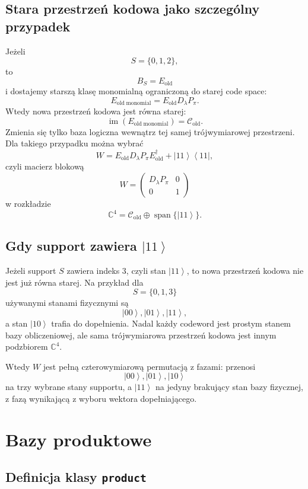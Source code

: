 \documentclass[11pt,a4paper]{article}
\newcommand{\C}{\mathbb{C}}
\newcommand{\Eold}{E_{\mathrm{old}}}
\newcommand{\Cold}{\mathcal{C}_{\mathrm{old}}}
\newcommand{\im}{\operatorname{im}}
\newcommand{\ket}[1]{\left|#1\right\rangle}
\newcommand{\bra}[1]{\left\langle#1\right|}
\begin{document}
\subsection{Stara przestrzeń kodowa jako szczególny przypadek}

Jeżeli
\[
    S=\{0,1,2\},
\]
to
\[
    B_S=\Eold
\]
i dostajemy starszą klasę monomialną ograniczoną do starej code space:
\[
    E_{\mathrm{old\;monomial}}
    =
    \Eold D_\lambda P_\pi.
\]
Wtedy nowa przestrzeń kodowa jest równa starej:
\[
    \im(E_{\mathrm{old\;monomial}})=\Cold.
\]
Zmienia się tylko baza logiczna wewnątrz tej samej trójwymiarowej przestrzeni.
Dla takiego przypadku można wybrać
\[
    W
    =
    \Eold D_\lambda P_\pi \Eold^\dagger
    +
    \ket{11}\bra{11},
\]
czyli macierz blokową
\[
    W
    =
    \begin{pmatrix}
        D_\lambda P_\pi & 0\\
        0 & 1
    \end{pmatrix}
\]
w rozkładzie
\[
    \C^4=\Cold\oplus\operatorname{span}\{\ket{11}\}.
\]

\subsection{Gdy support zawiera \(\ket{11}\)}

Jeżeli support \(S\) zawiera indeks \(3\), czyli stan \(\ket{11}\), to nowa
przestrzeń kodowa nie jest już równa starej. Na przykład dla
\[
    S=\{0,1,3\}
\]
używanymi stanami fizycznymi są
\[
    \ket{00},\ket{01},\ket{11},
\]
a stan \(\ket{10}\) trafia do dopełnienia. Nadal każdy codeword jest prostym
stanem bazy obliczeniowej, ale sama trójwymiarowa przestrzeń kodowa jest innym
podzbiorem \(\C^4\).

Wtedy \(W\) jest pełną czterowymiarową permutacją z fazami: przenosi
\[
    \ket{00},\ket{01},\ket{10}
\]
na trzy wybrane stany supportu, a \(\ket{11}\) na jedyny brakujący stan bazy
fizycznej, z fazą wynikającą z wyboru wektora dopełniającego.

\section{Bazy produktowe}

\subsection{Definicja klasy \texttt{product}}
\end{document}

